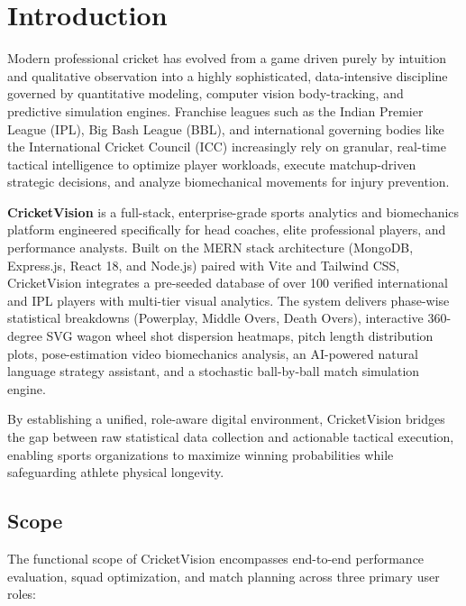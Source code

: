 \documentclass[12pt,a4paper]{report}
\begin{document}
\clearpage



\setcounter{page}{1}

\chapter{Introduction}

Modern professional cricket has evolved from a game driven purely by intuition and qualitative observation into a highly sophisticated, data-intensive discipline governed by quantitative modeling, computer vision body-tracking, and predictive simulation engines. Franchise leagues such as the Indian Premier League (IPL), Big Bash League (BBL), and international governing bodies like the International Cricket Council (ICC) increasingly rely on granular, real-time tactical intelligence to optimize player workloads, execute matchup-driven strategic decisions, and analyze biomechanical movements for injury prevention.

\textbf{CricketVision} is a full-stack, enterprise-grade sports analytics and biomechanics platform engineered specifically for head coaches, elite professional players, and performance analysts. Built on the MERN stack architecture (MongoDB, Express.js, React 18, and Node.js) paired with Vite and Tailwind CSS, CricketVision integrates a pre-seeded database of over 100 verified international and IPL players with multi-tier visual analytics. The system delivers phase-wise statistical breakdowns (Powerplay, Middle Overs, Death Overs), interactive 360-degree SVG wagon wheel shot dispersion heatmaps, pitch length distribution plots, pose-estimation video biomechanics analysis, an AI-powered natural language strategy assistant, and a stochastic ball-by-ball match simulation engine.

By establishing a unified, role-aware digital environment, CricketVision bridges the gap between raw statistical data collection and actionable tactical execution, enabling sports organizations to maximize winning probabilities while safeguarding athlete physical longevity.

\section{Scope}
The functional scope of CricketVision encompasses end-to-end performance evaluation, squad optimization, and match planning across three primary user roles:
\end{document}
